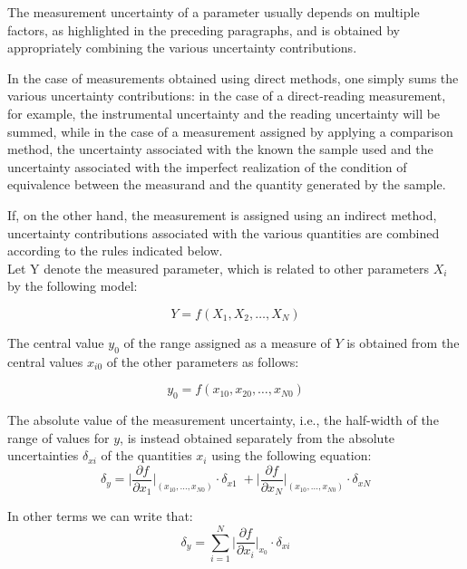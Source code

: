 \documentclass[../main.tex]{subfiles}
\begin{document}
The measurement uncertainty of a parameter usually depends on multiple factors, as highlighted in the preceding paragraphs, and is obtained by appropriately combining the various uncertainty contributions.

In the case of measurements obtained using direct methods, one simply sums the various uncertainty contributions: in the case of a direct-reading measurement, for example, the instrumental uncertainty and the reading uncertainty will be summed, while in the case of a measurement assigned by applying a comparison method, the uncertainty associated with the known the sample used and the uncertainty associated with the imperfect realization of the condition of  equivalence between the measurand and the quantity generated by the sample.

If, on the other hand, the measurement is assigned using an indirect method, uncertainty contributions associated with the various quantities are combined according to the rules indicated below.\\

Let Y denote the measured parameter, which is related to other parameters $X_i$ by the following model:

\begin{equation}
	Y = f(X_1,X_2,\dots, X_N)
\end{equation}

The central value $y_0$ of the range assigned as a measure of $Y$ is obtained from the central values $x_{i0}$ of the other parameters as follows:

\begin{equation}
	y_0 = f(x_10, x_20, \dots, x_{N0})
\end{equation}

The absolute value of the measurement uncertainty, i.e., the half-width of the range of values for $y$, is instead obtained separately from the absolute uncertainties $\delta_{xi}$ of the quantities $x_i$ using the following equation:\\


\begin{equation}
	\delta_y = \bigg|  \frac{\partial f}{\partial x_1}   \bigg|_{(x_{10},\dots,x_{N0})} \cdot \delta_{x1} \; + \bigg| \frac{\partial f}{\partial x_N}   \bigg|_{(x_{10},\dots,x_{N0})} \cdot \delta_{xN} 
\end{equation}

In other terms we can write that:\\

\begin{equation}
	\delta_y = \sum_{i = 1}^N  \bigg| \frac{\partial f}{\partial x_i} \bigg|_{x_0} \cdot \delta_{xi}	
\end{equation}
\end{document}
